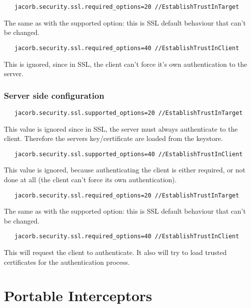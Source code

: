 \documentclass[12pt]{scrbook}
\begin{document}
\begin{verbatim}
   jacorb.security.ssl.required_options=20 //EstablishTrustInTarget
\end{verbatim}
The same as with the supported option: this is SSL default behaviour
that can't be changed.

\begin{verbatim}
   jacorb.security.ssl.required_options=40 //EstablishTrustInClient
\end{verbatim}
This is ignored, since in SSL, the client can't force it's own
authentication to the server.


\subsection{Server side configuration}

\begin{verbatim}
   jacorb.security.ssl.supported_options=20 //EstablishTrustInTarget
\end{verbatim}
This value is ignored since in SSL, the server must always
authenticate to the client. Therefore the servers key/certificate are
loaded from the keystore.

\begin{verbatim}
   jacorb.security.ssl.supported_options=40 //EstablishTrustInClient
\end{verbatim}
This value is ignored, because authenticating the client is either
required, or not done at all (the client can't force its own
authentication).

\begin{verbatim}
   jacorb.security.ssl.required_options=20 //EstablishTrustInTarget
\end{verbatim}
The same as with the supported option: this is SSL default behaviour
that can't be changed.

\begin{verbatim}
   jacorb.security.ssl.required_options=40 //EstablishTrustInClient
\end{verbatim}
This will request the client to authenticate. It also will try to load
trusted certificates for the authentication process.



\chapter{Portable Interceptors}
\end{document}
